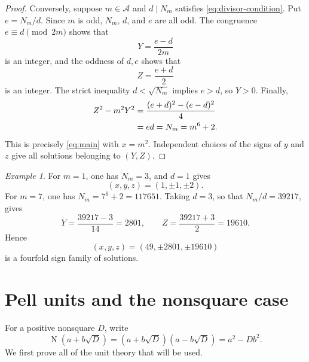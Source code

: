\documentclass[a4paper,11pt]{amsart}
\numberwithin{equation}{section}
\theoremstyle{definition}
\theoremstyle{remark}
\newtheorem{example}[theorem]{Example}
\newcommand{\Acal}{\mathcal A}
\newcommand{\Norm}{\operatorname N}
\begin{document}
\begin{proof}
Conversely, suppose \(m\in\Acal\) and \(d\mid N_m\) satisfies
\eqref{eq:divisor-condition}.  Put \(e=N_m/d\).  Since \(m\) is odd,
\(N_m\), \(d\), and \(e\) are all odd.  The congruence
\(e\equiv d\pmod{2m}\) shows that
\begin{equation*}
 Y=\frac{e-d}{2m}
\end{equation*}
is an integer, and the oddness of \(d,e\) shows that
\begin{equation*}
 Z=\frac{e+d}{2}
\end{equation*}
is an integer.  The strict inequality \(d<\sqrt{N_m}\) implies \(e>d\), so
\(Y>0\).  Finally,
\begin{align}\label{eq:factor-verification}
 Z^2-m^2Y^2
 &=\frac{(e+d)^2-(e-d)^2}{4}\notag\\
 &=ed=N_m=m^6+2.
\end{align}
This is precisely \eqref{eq:main} with \(x=m^2\).  Independent choices of
the signs of \(y\) and \(z\) give all solutions belonging to \((Y,Z)\).
\end{proof}

\begin{example}\label{ex:square}
For \(m=1\), one has \(N_m=3\), and \(d=1\) gives
\begin{equation*}
 (x,y,z)=(1,\pm1,\pm2).
\end{equation*}
For \(m=7\), one has \(N_m=7^6+2=117651\).  Taking \(d=3\), so that
\(N_m/d=39217\), gives
\begin{equation*}
 Y=\frac{39217-3}{14}=2801,
 \qquad
 Z=\frac{39217+3}{2}=19610.
\end{equation*}
Hence
\begin{equation*}
 (x,y,z)=(49,\pm2801,\pm19610)
\end{equation*}
is a fourfold sign family of solutions.
\end{example}

\section{Pell units and the nonsquare case}

For a positive nonsquare \(D\), write
\begin{equation}\label{eq:norm-definition}
 \Norm(a+b\sqrt D)=(a+b\sqrt D)(a-b\sqrt D)=a^2-Db^2.
\end{equation}
We first prove all of the unit theory that will be used.
\end{document}
